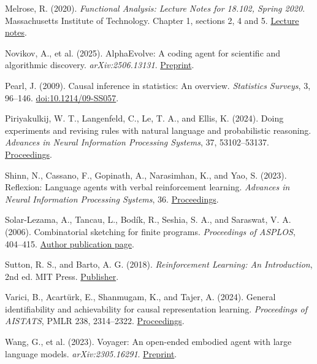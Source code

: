 \documentclass[11pt,a4paper]{article}
\begin{document}
Melrose, R. (2020). \emph{Functional Analysis: Lecture Notes for 18.102, Spring 2020}. Massachusetts Institute of Technology. Chapter 1, sections 2, 4 and 5. \href{https://ocw.mit.edu/courses/18-102-introduction-to-functional-analysis-spring-2021/3d4cc88026d44a01f936cd6a0aa995cb_MIT18_102s20_lec_FA.pdf}{Lecture notes}.


Novikov, A., et al. (2025). AlphaEvolve: A coding agent for scientific and algorithmic discovery. \emph{arXiv:2506.13131}. \href{https://arxiv.org/abs/2506.13131}{Preprint}.


Pearl, J. (2009). Causal inference in statistics: An overview. \emph{Statistics Surveys}, 3, 96–146. \href{https://doi.org/10.1214/09-SS057}{doi:10.1214/09-SS057}.


Piriyakulkij, W. T., Langenfeld, C., Le, T. A., and Ellis, K. (2024). Doing experiments and revising rules with natural language and probabilistic reasoning. \emph{Advances in Neural Information Processing Systems}, 37, 53102–53137. \href{https://papers.nips.cc/paper_files/paper/2024/hash/5f1b350fc0c2affd56f465faa36be343-Abstract-Conference.html}{Proceedings}.


Shinn, N., Cassano, F., Gopinath, A., Narasimhan, K., and Yao, S. (2023). Reflexion: Language agents with verbal reinforcement learning. \emph{Advances in Neural Information Processing Systems}, 36. \href{https://proceedings.neurips.cc/paper_files/paper/2023/hash/1b44b878bb782e6954cd888628510e90-Abstract-Conference.html}{Proceedings}.


Solar-Lezama, A., Tancau, L., Bodík, R., Seshia, S. A., and Saraswat, V. A. (2006). Combinatorial sketching for finite programs. \emph{Proceedings of ASPLOS}, 404–415. \href{https://people.eecs.berkeley.edu/~sseshia/pubs/b2hd-solar-asplos06.html}{Author publication page}.


Sutton, R. S., and Barto, A. G. (2018). \emph{Reinforcement Learning: An Introduction}, 2nd ed. MIT Press. \href{https://mitpress.mit.edu/9780262039246/reinforcement-learning/}{Publisher}.


Varici, B., Acartürk, E., Shanmugam, K., and Tajer, A. (2024). General identifiability and achievability for causal representation learning. \emph{Proceedings of AISTATS}, PMLR 238, 2314–2322. \href{https://proceedings.mlr.press/v238/varici24a.html}{Proceedings}.


Wang, G., et al. (2023). Voyager: An open-ended embodied agent with large language models. \emph{arXiv:2305.16291}. \href{https://arxiv.org/abs/2305.16291}{Preprint}.
\end{document}

